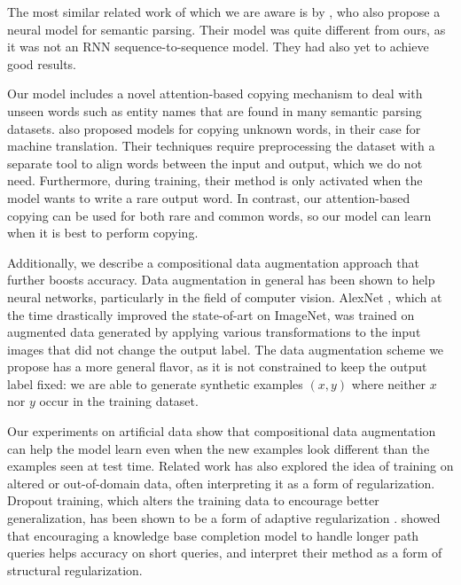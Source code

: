 \documentclass[11pt,letterpaper]{article}
\newcommand\rj[1]{}
\begin{document}
The most similar related work of which we are aware is
by ,
who also propose a neural model for semantic parsing.
Their model was quite different from ours, as
it was not an RNN sequence-to-sequence model.
They had also yet to achieve good results.
\rj{I couldn't find a good place to put it in the intro, so I moved it here}

Our model includes a novel attention-based copying mechanism
to deal with unseen words such as entity names that are found in many semantic parsing datasets.
 also proposed models for copying
unknown words, in their case for machine translation. 
Their techniques require preprocessing the dataset
with a separate tool to align words between the input and output,
which we do not need.
Furthermore, during training, their method is only activated when the model
wants to write a rare output word. 
In contrast, our attention-based copying can be used for 
both rare and common words,
so our model can learn when it is best to perform copying.

Additionally, we describe a compositional data augmentation approach that 
further boosts accuracy.
Data augmentation in general has been shown to help neural networks,
particularly in the field of computer vision.
AlexNet \cite{krizhevsky2012imagenet}, 
which at the time drastically improved
the state-of-art on ImageNet,
was trained on augmented data generated by applying various transformations
to the input images that did not change the output label.
The data augmentation scheme we propose has a more general flavor,
as it is not constrained to keep the output label fixed:
we are able to generate synthetic examples $(x, y)$
where neither $x$ nor $y$ occur in the training dataset.

Our experiments on artificial data show that
compositional data augmentation can help the model learn
even when the new examples look different than the examples seen at test time.  
Related work has also explored the idea of training on 
altered or out-of-domain data, often interpreting
it as a form of regularization.
Dropout training, which alters the training data
to encourage better generalization, has
been shown to be a form of adaptive regularization
\cite{hinton2012improving,wager2014altitude}.
showed that encouraging a knowledge base completion model
to handle longer path queries helps accuracy on
short queries, and interpret their method as
a form of structural regularization.
\end{document}
